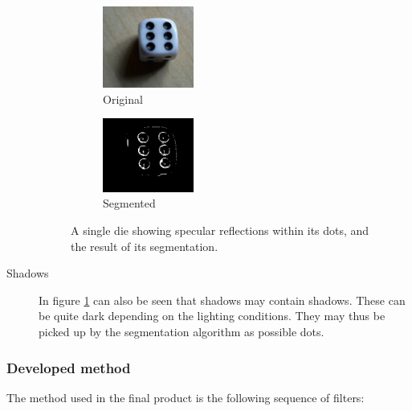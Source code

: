 \begin{description}
\begin{figure}
	\centering
	\begin{subfigure}[b]{3cm}
		\includegraphics[width=30mm]{images/dies/specular.png}
		\caption{Original}
		\label{fig:dotSpecularOriginal}
	\end{subfigure}
	\hspace{1cm}
	\begin{subfigure}[b]{3cm}
		\includegraphics[width=30mm]{images/dies/specular_thresholded.png}
		\caption{Segmented}
	\end{subfigure}

	\caption{A single die showing specular reflections within its dots, and the result of its segmentation.}
	\label{fig:dotSpecular}
\end{figure}

\item[Shadows] In figure \ref{fig:dotSpecularOriginal} can also be seen that shadows may contain shadows. These can be quite dark depending on the lighting conditions. They may thus be picked up by the segmentation algorithm as possible dots. 
\end{description}

\subsubsection{Developed method}
The method used in the final product is the following sequence of filters:

